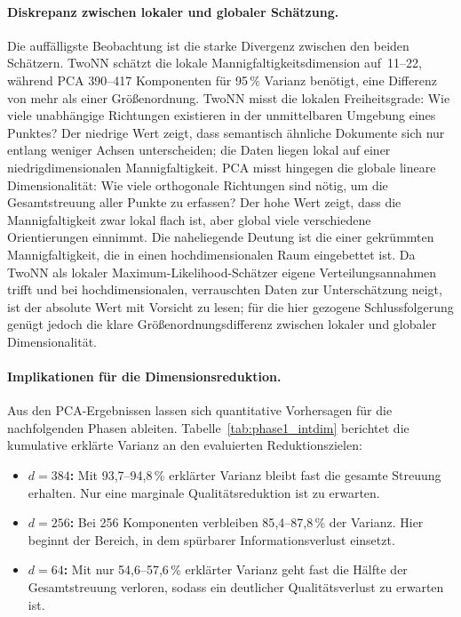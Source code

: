 \paragraph{Diskrepanz zwischen lokaler und globaler Schätzung.}
Die auffälligste Beobachtung ist die starke Divergenz zwischen den beiden Schätzern.
TwoNN schätzt die lokale Mannigfaltigkeitsdimension auf~11--22, während PCA 390--417 Komponenten für 95\,\% Varianz benötigt, eine Differenz von mehr als einer Größenordnung.
%
TwoNN misst die lokalen Freiheitsgrade: Wie viele unabhängige Richtungen existieren in der unmittelbaren Umgebung eines Punktes?
Der niedrige Wert zeigt, dass semantisch ähnliche Dokumente sich nur entlang weniger Achsen unterscheiden; die Daten liegen lokal auf einer niedrigdimensionalen Mannigfaltigkeit.
%
PCA misst hingegen die globale lineare Dimensionalität: Wie viele orthogonale Richtungen sind nötig, um die Gesamtstreuung aller Punkte zu erfassen?
Der hohe Wert zeigt, dass die Mannigfaltigkeit zwar lokal flach ist, aber global viele verschiedene Orientierungen einnimmt.
Die naheliegende Deutung ist die einer gekrümmten Mannigfaltigkeit, die in einen hochdimensionalen Raum eingebettet ist.
Da TwoNN als lokaler Maximum-Likelihood-Schätzer eigene Verteilungsannahmen trifft und bei hochdimensionalen, verrauschten Daten zur Unterschätzung neigt, ist der absolute Wert mit Vorsicht zu lesen; für die hier gezogene Schlussfolgerung genügt jedoch die klare Größenordnungsdifferenz zwischen lokaler und globaler Dimensionalität.
%
\paragraph{Implikationen für die Dimensionsreduktion.}
Aus den PCA-Ergebnissen lassen sich quantitative Vorhersagen für die nachfolgenden Phasen ableiten.
Tabelle~\ref{tab:phase1_intdim} berichtet die kumulative erklärte Varianz an den evaluierten Reduktionszielen:
\begin{itemize}
  \item \textbf{$d = 384$:} Mit 93{,}7--94{,}8\,\% erklärter Varianz bleibt fast die gesamte Streuung erhalten.
  Nur eine marginale Qualitätsreduktion ist zu erwarten.
  \item \textbf{$d = 256$:} Bei 256 Komponenten verbleiben 85{,}4--87{,}8\,\% der Varianz.
  Hier beginnt der Bereich, in dem spürbarer Informationsverlust einsetzt.
  \item \textbf{$d = 64$:} Mit nur 54{,}6--57{,}6\,\% erklärter Varianz geht fast die Hälfte der Gesamtstreuung verloren, sodass ein deutlicher Qualitätsverlust zu erwarten ist.
\end{itemize}
%
